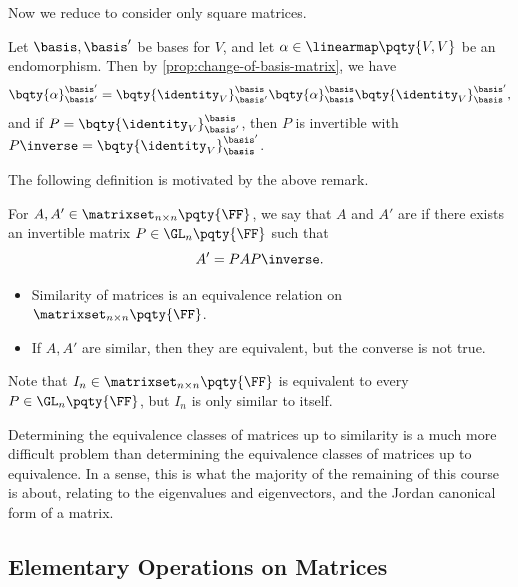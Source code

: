 Now we reduce to consider only square matrices.

\begin{remark}
    Let \(\basis, \basis'\) be bases for \(V\), and let \(\alpha \in \linearmap\pqty{V, V}\) be an endomorphism. Then by \autoref{prop:change-of-basis-matrix}, we have
    \[
        \bqty{\alpha}_{\basis'}^{\basis'} = \bqty{\identity_V}_{\basis'}^{\basis} \bqty{\alpha}_{\basis}^{\basis} \bqty{\identity_V}_{\basis}^{\basis'},
    \]
    and if \(P = \bqty{\identity_V}_{\basis'}^{\basis}\), then \(P\) is invertible with \(P\inverse = \bqty{\identity_V}_{\basis}^{\basis'}\).
\end{remark}

The following definition is motivated by the above remark.

\begin{definition}
    For \(A, A' \in \matrixset_{n \times n} \pqty{\FF}\), we say that \(A\) and \(A'\) are  if there exists an invertible matrix \(P \in \GL_n\pqty{\FF}\) such that
    \[
        A' = P A P\inverse.
    \]
\end{definition}

\begin{remarks}
    \begin{itemize}
        \item Similarity of matrices is an equivalence relation on \(\matrixset_{n \times n} \pqty{\FF}\).
        \item If \(A, A'\) are similar, then they are equivalent, but the converse is not true.
    \end{itemize}
\end{remarks}

\begin{example}
    Note that \(I_n \in \matrixset_{n \times n} \pqty{\FF}\) is equivalent to every \(P \in \GL_n\pqty{\FF}\), but \(I_n\) is only similar to itself.
\end{example}

Determining the equivalence classes of matrices up to similarity is a much more difficult problem than determining the equivalence classes of matrices up to equivalence. In a sense, this is what the majority of the remaining of this course is about, relating to the eigenvalues and eigenvectors, and the Jordan canonical form of a matrix.

\subsection{Elementary Operations on Matrices}

